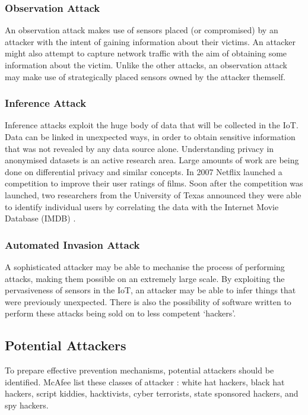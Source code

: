 \documentclass[10pt,journal,compsoc]{IEEEtran}
\begin{document}
\subsubsection{Observation Attack}
An observation attack makes use of sensors placed (or compromised) by an
attacker with the intent of gaining information about their victims. An
attacker might also attempt to capture network traffic with the aim of
obtaining some information about the victim. Unlike the other attacks, an
observation attack may make use of strategically placed sensors owned by the
attacker themself.

\subsubsection{Inference Attack}
Inference attacks exploit the huge body of data that will be collected in the
IoT. Data can be linked in unexpected ways, in order to obtain sensitive
information that was not revealed by any data source alone. Understanding
privacy in anonymised datasets is an active research area. Large amounts of
work are being done on differential privacy and similar concepts. In 2007
Netflix launched a competition to improve their user ratings of films. Soon
after the competition was launched, two researchers from the University of
Texas announced they were able to identify individual users by correlating the
data with the Internet Movie Database (IMDB) \cite{Narayanan2008}.

\subsubsection{Automated Invasion Attack}
A sophisticated attacker may be able to mechanise the process of performing
attacks, making them possible on an extremely large scale. By exploiting the
pervasiveness of sensors in the IoT, an attacker may be able to infer things
that were previously unexpected. There is also the possibility of software
written to perform these attacks being sold on to less competent `hackers'. 

\subsection{Potential Attackers}
To prepare effective prevention mechanisms, potential attackers should be
identified. McAfee list these classes of attacker \cite{McAfee2011}:
white hat hackers, black hat hackers, script kiddies, hacktivists, cyber
terrorists, state sponsored hackers, and spy hackers. 
\end{document}
